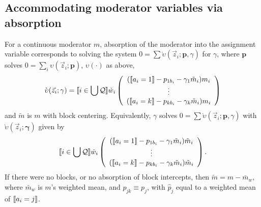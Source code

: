 \documentclass{article}
\DeclarePairedDelimiter{\indicator}{\llbracket}{\rrbracket}
\newcommand{\owt}[1][{[a_i]}]{\ensuremath{\check{w}_{i#1}}}
\newcommand{\absorbInterceptsEF}{\upsilon}
\newcommand{\absorbModeratorEF}{\grave{\upsilon}}
\begin{document}
\subsection{Accommodating moderator variables via absorption}
\label{sec:accomm-moder-vari}
For a continuous moderator $m$, absorption of the moderator into the assignment variable
corresponds to solving the system $0 = \sum
\absorbModeratorEF(\vec{z}_{i}; \mathbf{p},{\gamma})$ for
$\gamma$, where $\mathbf{p}$ solves $0 =
\sum_{i}\absorbInterceptsEF(\vec{z}_{i}; \mathbf{p})$,
$\absorbInterceptsEF(\cdot)$ as above, 
\begin{equation}
  \label{eq:18}
    \absorbModeratorEF(\vec{z}_{i}; \mathbf{\gamma})=
    \indicator{i \in \bigcup \mathcal{Q}} \owt[]
     \left(
                                                 \begin{array}{c}
                                                   (\indicator{a_{i}=1}-p_{1b_{i}}-\gamma_{1}
                                                   \tilde{m}_{i})m_{i} \\
                                                   \vdots\\
                                                   (\indicator{a_{i}=k}-p_{kb_{i}}
                                                   - \gamma_{k} \tilde{m}_{i})m_{i}\\
                                                 \end{array}
  \right)%
\end{equation}
and $\tilde{m}$ is $m$ with block centering. Equivalently, $\gamma$
solves $0 = \sum
\absorbModeratorEF(\vec{z}_{i}; \mathbf{p},{\gamma})$ with 
$\absorbModeratorEF(\vec{z}_{i}; \mathbf{\gamma})$ given by 
\begin{equation*}
    \indicator{i \in \bigcup \mathcal{Q}} \owt[]
     \left(
                                                 \begin{array}{c}
                                                   (\indicator{a_{i}=1}-p_{1b_{i}}-\gamma_{1}
                                                   \tilde{m}_{i})\tilde{m}_{i} \\
                                                   \vdots\\
                                                   (\indicator{a_{i}=k}-p_{kb_{i}}
                                                   - \gamma_{k} \tilde{m}_{i})\tilde{m}_{i}\\
                                                 \end{array}
  \right).
\end{equation*}
If there were no blocks,
or no absorption of block intercepts, then $\tilde{m} = m -
\bar{m}_{w}$,  where $\bar{m}_{w}$ is $m$'s weighted mean, and $p_{jk}
\equiv p_{j}$, with $\hat{p}_{j}$ equal to a weighted mean of
$\indicator{a_{i}=j}$. 
\end{document}
